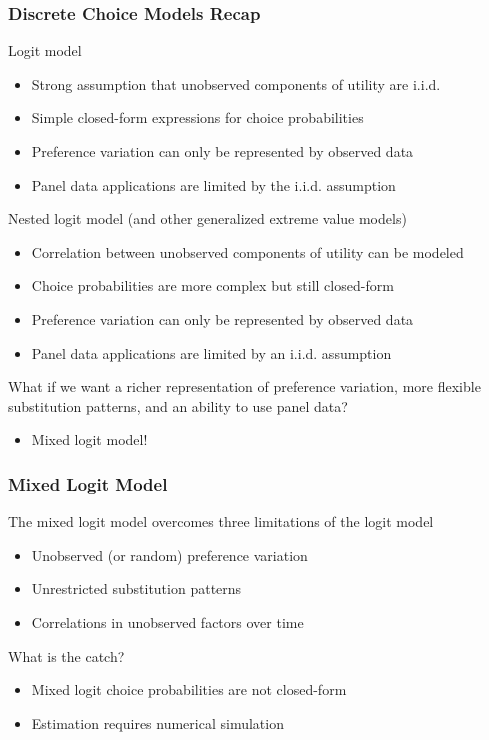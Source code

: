 \documentclass{beamer}\usepackage[]{graphicx}\usepackage[]{color}
\begin{document}
\begin{frame}\frametitle{Discrete Choice Models Recap}
    Logit model
    \begin{itemize}
        \item Strong assumption that unobserved components of utility are i.i.d.
        \item Simple closed-form expressions for choice probabilities
        \item Preference variation can only be represented by observed data
        \item Panel data applications are limited by the i.i.d. assumption
    \end{itemize}
    \vspace{2ex}
    Nested logit model (and other generalized extreme value models)
    \begin{itemize}
        \item Correlation between unobserved components of utility can be modeled
        \item Choice probabilities are more complex but still closed-form
        \item Preference variation can only be represented by observed data
        \item Panel data applications are limited by an i.i.d. assumption
    \end{itemize}
    \vspace{2ex}
    What if we want a richer representation of preference variation, more flexible substitution patterns, and an ability to use panel data?
    \begin{itemize}
        \item Mixed logit model!
    \end{itemize}
\end{frame}


\begin{frame}\frametitle{Mixed Logit Model}
    The mixed logit model overcomes three limitations of the logit model
    \begin{itemize}
        \item Unobserved (or random) preference variation
        \item Unrestricted substitution patterns
        \item Correlations in unobserved factors over time
    \end{itemize}
    \vspace{3ex}
    What is the catch?
    \begin{itemize}
        \item Mixed logit choice probabilities are not closed-form
        \item Estimation requires numerical simulation
    \end{itemize}
\end{frame}
\end{document}
